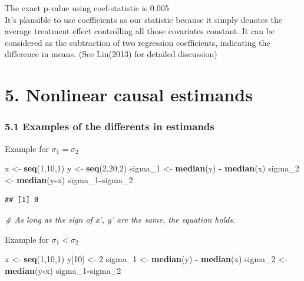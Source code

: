 \documentclass[]{article}
\newenvironment{Shaded}{\begin{snugshade}}{\end{snugshade}}
\newcommand{\KeywordTok}[1]{\textcolor[rgb]{0.13,0.29,0.53}{\textbf{#1}}}
\newcommand{\DecValTok}[1]{\textcolor[rgb]{0.00,0.00,0.81}{#1}}
\newcommand{\StringTok}[1]{\textcolor[rgb]{0.31,0.60,0.02}{#1}}
\newcommand{\CommentTok}[1]{\textcolor[rgb]{0.56,0.35,0.01}{\textit{#1}}}
\newcommand{\OperatorTok}[1]{\textcolor[rgb]{0.81,0.36,0.00}{\textbf{#1}}}
\newcommand{\NormalTok}[1]{#1}
\begin{document}
The exact p-value using coef-statistic is 0.005\\
It's plausible to use coefficients as our statistic because it simply
denotes the average treatment effect controlling all those covariates
constant. It can be considered as the subtraction of two regression
coefficients, indicating the difference in means. (See Lin(2013) for
detailed discussion)

\section*{5. Nonlinear causal estimands}\subsubsection*{5.1 Examples of the differents in estimands}

Example for \(\sigma_1 = \sigma_2\)

\begin{Shaded}
\begin{Highlighting}[]
\NormalTok{x <-}\StringTok{ }\KeywordTok{seq}\NormalTok{(}\DecValTok{1}\NormalTok{,}\DecValTok{10}\NormalTok{,}\DecValTok{1}\NormalTok{)}
\NormalTok{y <-}\StringTok{ }\KeywordTok{seq}\NormalTok{(}\DecValTok{2}\NormalTok{,}\DecValTok{20}\NormalTok{,}\DecValTok{2}\NormalTok{)}
\NormalTok{sigma_}\DecValTok{1}\NormalTok{ <-}\StringTok{ }\KeywordTok{median}\NormalTok{(y) }\OperatorTok{-}\StringTok{ }\KeywordTok{median}\NormalTok{(x)}
\NormalTok{sigma_}\DecValTok{2}\NormalTok{ <-}\StringTok{ }\KeywordTok{median}\NormalTok{(y}\OperatorTok{-}\NormalTok{x)}
\NormalTok{sigma_}\DecValTok{1}\OperatorTok{-}\NormalTok{sigma_}\DecValTok{2}
\end{Highlighting}
\end{Shaded}

\begin{verbatim}
## [1] 0
\end{verbatim}

\begin{Shaded}
\begin{Highlighting}[]
\CommentTok{# As long as the sign of x', y' are the same, the equation holds.}
\end{Highlighting}
\end{Shaded}

Example for \(\sigma_1 < \sigma_2\)

\begin{Shaded}
\begin{Highlighting}[]
\NormalTok{x <-}\StringTok{ }\KeywordTok{seq}\NormalTok{(}\DecValTok{1}\NormalTok{,}\DecValTok{10}\NormalTok{,}\DecValTok{1}\NormalTok{)}
\NormalTok{y[}\DecValTok{10}\NormalTok{] <-}\StringTok{ }\DecValTok{2}
\NormalTok{sigma_}\DecValTok{1}\NormalTok{ <-}\StringTok{ }\KeywordTok{median}\NormalTok{(y) }\OperatorTok{-}\StringTok{ }\KeywordTok{median}\NormalTok{(x)}
\NormalTok{sigma_}\DecValTok{2}\NormalTok{ <-}\StringTok{ }\KeywordTok{median}\NormalTok{(y}\OperatorTok{-}\NormalTok{x)}
\NormalTok{sigma_}\DecValTok{1}\OperatorTok{-}\NormalTok{sigma_}\DecValTok{2}
\end{Highlighting}
\end{Shaded}
\end{document}
